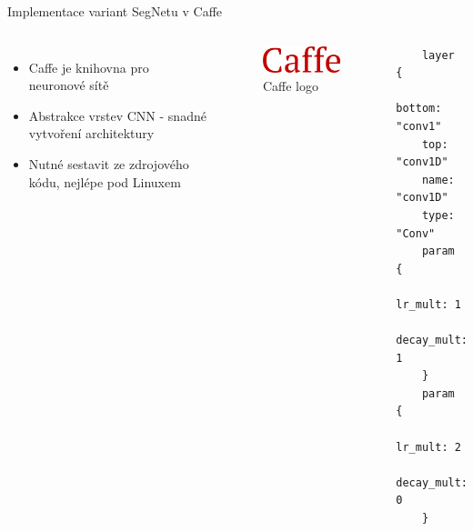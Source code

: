 \documentclass[aspectratio=1610]{beamer}
\begin{document}
\begin{frame}[fragile]{Implementace variant SegNetu v Caffe}
	\begin{columns}
		{
			\begin{itemize}	
				\item Caffe je knihovna pro neuronové sítě		
				\item Abstrakce vrstev CNN - snadné vytvoření architektury
				\item Nutné sestavit ze zdrojového kódu, nejlépe pod Linuxem		
			\end{itemize}
		}
		\vspace{5mm}
		\begin{figure}[h]
			\begin{center}
				\includegraphics[width=4cm, keepaspectratio]{caffe-logo.png}
			\end{center}	
			\caption{Caffe logo} 	
		\end{figure}
	
\begin{lstlisting}
	layer {
	bottom: "conv1"
	top: "conv1D"
	name: "conv1D"
	type: "Conv"
	param {
	lr_mult: 1
	decay_mult: 1
	}
	param {
	lr_mult: 2
	decay_mult: 0
	}			
	\end{lstlisting}		
	\end{columns}
\end{frame}
\end{document}

